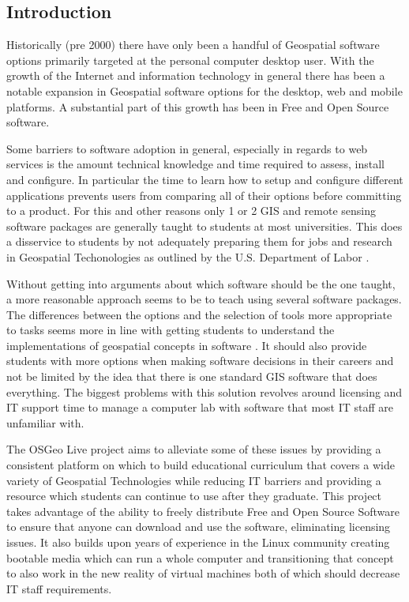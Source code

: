 \documentclass[12pt,letterpaper]{article}
\begin{document}
\subsection{Introduction}
	Historically (pre 2000) there have only been a handful of Geospatial software options primarily targeted at the personal computer desktop user. With the growth of the Internet and information technology in general there has been a notable expansion in Geospatial software options for the desktop, web and mobile platforms. A substantial part of this growth has been in Free and Open Source software.

	Some barriers to software adoption in general, especially in regards to web services is the amount technical knowledge and time required to assess, install and configure. In particular the time to learn how to setup and configure different applications prevents users from comparing all of their options before committing to a product. For this and other reasons only 1 or 2 GIS and remote sensing software packages are generally taught to students at most universities. This does a disservice to students by not adequately preparing them for jobs and research in Geospatial Techonologies as outlined by the U.S. Department of Labor \parencite{DepartmentofLabor2011}.
	
	Without getting into arguments about which software should be the one taught, a more reasonable approach seems to be to teach using several software packages. The differences between the options and the selection of tools more appropriate to tasks seems more in line with getting students to understand the implementations of geospatial concepts in software \parencite{Cammack2005}. It should also provide students with more options when making software decisions in their careers and not be limited by the idea that there is one standard GIS software that does everything. The biggest problems with this solution revolves around licensing and IT support time to manage a computer lab with software that most IT staff are unfamiliar with. 
	
	The OSGeo Live project aims to alleviate some of these issues by providing a consistent platform on which to build educational curriculum that covers a wide variety of Geospatial Technologies while reducing IT barriers and providing a resource which students can continue to use after they graduate. This project takes advantage of the ability to freely distribute Free and Open Source Software to ensure that anyone can download and use the software, eliminating licensing issues. It also builds upon years of experience in the Linux community creating bootable media \parencite{Negus2006,Knopper2006} which can run a whole computer and transitioning that concept to also work in the new reality of virtual machines both of which should decrease IT staff requirements.
\end{document}
